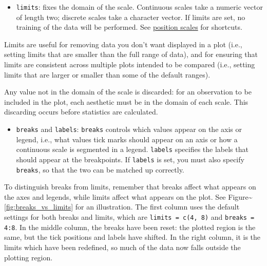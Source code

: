 \begin{itemize}
\itemsep1pt\parskip0pt
\item
  \texttt{limits}: fixes the domain of the scale. Continuous scales take
  a numeric vector of length two; discrete scales take a character
  vector. If limits are set, no training of the data will be performed.
  See \hyperref[sub:scale-position]{position scales} for shortcuts.
   
\end{itemize}

Limits are useful for removing data you don't want displayed in a plot
(i.e., setting limits that are smaller than the full range of data), and
for ensuring that limits are consistent across multiple plots intended
to be compared (i.e., setting limits that are larger or smaller than
some of the default ranges).

Any value not in the domain of the scale is discarded: for an
observation to be included in the plot, each aesthetic must be in the
domain of each scale. This discarding occurs before statistics are
calculated.

\begin{itemize}
\itemsep1pt\parskip0pt
\item
  \texttt{breaks} and \texttt{labels}: \texttt{breaks} controls which
  values appear on the axis or legend, i.e., what values tick marks
  should appear on an axis or how a continuous scale is segmented in a
  legend. \texttt{labels} specifies the labels that should appear at the
  breakpoints. If \texttt{labels} is set, you must also specify
  \texttt{breaks}, so that the two can be matched up correctly.
    
\end{itemize}

To distinguish breaks from limits, remember that breaks affect what
appears on the axes and legends, while limits affect what appears on the
plot. See Figure\textasciitilde{}\ref{fig:breaks_vs_limits} for an
illustration. The first column uses the default settings for both breaks
and limits, which are \texttt{limits = c(4, 8)} and
\texttt{breaks = 4:8}. In the middle column, the breaks have been reset:
the plotted region is the same, but the tick positions and labels have
shifted. In the right column, it is the limits which have been
redefined, so much of the data now falls outside the plotting region.

\begin{Shaded}
\begin{Highlighting}[]
\StringTok{ } 
\end{Highlighting}
\end{Shaded}

